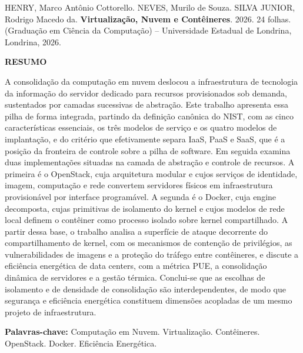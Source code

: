 \noindent HENRY, Marco Antônio Cottorello. NEVES, Murilo de Souza. SILVA JUNIOR, Rodrigo Macedo da.
\textbf{Virtualização, Nuvem e Contêineres}. 2026.
24 folhas.
(Graduação em Ciência da Computação) -- Universidade Estadual de Londrina,
Londrina, 2026.

\vspace{2\baselineskip}

\begin{center}
  \textbf{RESUMO}
\end{center}

\vspace{\baselineskip}

\noindent A consolidação da computação em nuvem deslocou a infraestrutura de tecnologia da informação do servidor dedicado para recursos provisionados sob demanda, sustentados por camadas sucessivas de abstração. Este trabalho apresenta essa pilha de forma integrada, partindo da definição canônica do NIST, com as cinco características essenciais, os três modelos de serviço e os quatro modelos de implantação, e do critério que efetivamente separa IaaS, PaaS e SaaS, que é a posição da fronteira de controle sobre a pilha de software. Em seguida examina duas implementações situadas na camada de abstração e controle de recursos. A primeira é o OpenStack, cuja arquitetura modular e cujos serviços de identidade, imagem, computação e rede convertem servidores físicos em infraestrutura provisionável por interface programável. A segunda é o Docker, cuja engine decomposta, cujas primitivas de isolamento do kernel e cujos modelos de rede local definem o contêiner como processo isolado sobre kernel compartilhado. A partir dessa base, o trabalho analisa a superfície de ataque decorrente do compartilhamento de kernel, com os mecanismos de contenção de privilégios, as vulnerabilidades de imagens e a proteção do tráfego entre contêineres, e discute a eficiência energética de data centers, com a métrica PUE, a consolidação dinâmica de servidores e a gestão térmica. Conclui-se que as escolhas de isolamento e de densidade de consolidação são interdependentes, de modo que segurança e eficiência energética constituem dimensões acopladas de um mesmo projeto de infraestrutura.

\vfill

\noindent\textbf{Palavras-chave:} Computação em Nuvem. Virtualização. Contêineres. OpenStack. Docker. Eficiência Energética.
